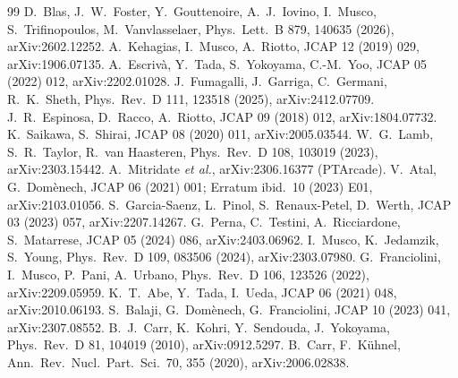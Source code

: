 \documentclass[11pt,a4paper]{article}
\begin{document}
\begin{thebibliography}{99}
 D.~Blas, J.~W.~Foster, Y.~Gouttenoire, A.~J.~Iovino, I.~Musco, S.~Trifinopoulos, M.~Vanvlasselaer, Phys.\ Lett.\ B 879, 140635 (2026), arXiv:2602.12252.
 A.~Kehagias, I.~Musco, A.~Riotto, JCAP 12 (2019) 029, arXiv:1906.07135.
 A.~Escriv\`a, Y.~Tada, S.~Yokoyama, C.-M.~Yoo, JCAP 05 (2022) 012, arXiv:2202.01028.
 J.~Fumagalli, J.~Garriga, C.~Germani, R.~K.~Sheth, Phys.\ Rev.\ D 111, 123518 (2025), arXiv:2412.07709.
 J.~R.~Espinosa, D.~Racco, A.~Riotto, JCAP 09 (2018) 012, arXiv:1804.07732.
 K.~Saikawa, S.~Shirai, JCAP 08 (2020) 011, arXiv:2005.03544.
 W.~G.~Lamb, S.~R.~Taylor, R.~van Haasteren, Phys.\ Rev.\ D 108, 103019 (2023), arXiv:2303.15442.
 A.~Mitridate {\it et al.}, arXiv:2306.16377 (PTArcade).
 V.~Atal, G.~Dom\`enech, JCAP 06 (2021) 001; Erratum ibid.\ 10 (2023) E01, arXiv:2103.01056.
 S.~Garcia-Saenz, L.~Pinol, S.~Renaux-Petel, D.~Werth, JCAP 03 (2023) 057, arXiv:2207.14267.
 G.~Perna, C.~Testini, A.~Ricciardone, S.~Matarrese, JCAP 05 (2024) 086, arXiv:2403.06962.
 I.~Musco, K.~Jedamzik, S.~Young, Phys.\ Rev.\ D 109, 083506 (2024), arXiv:2303.07980.
 G.~Franciolini, I.~Musco, P.~Pani, A.~Urbano, Phys.\ Rev.\ D 106, 123526 (2022), arXiv:2209.05959.
 K.~T.~Abe, Y.~Tada, I.~Ueda, JCAP 06 (2021) 048, arXiv:2010.06193.
 S.~Balaji, G.~Dom\`enech, G.~Franciolini, JCAP 10 (2023) 041, arXiv:2307.08552.
 B.~J.~Carr, K.~Kohri, Y.~Sendouda, J.~Yokoyama, Phys.\ Rev.\ D 81, 104019 (2010), arXiv:0912.5297.
 B.~Carr, F.~K\"uhnel, Ann.\ Rev.\ Nucl.\ Part.\ Sci.\ 70, 355 (2020), arXiv:2006.02838.
\end{thebibliography}
\end{document}
